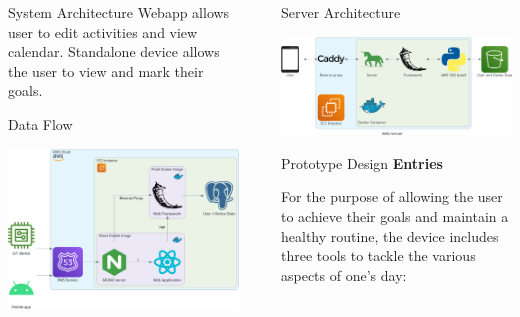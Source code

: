 \documentclass[final]{beamer}
\newlength{\sepwidth}
\newlength{\colwidth}
\newcommand{\separatorcolumn}{\begin{column}{\sepwidth}\end{column}}
\begin{document}
\begin{frame}[t]
\begin{columns}[t]
\begin{column}{\colwidth}
\begin{block}{System Architecture}
    Webapp allows user to edit activities and view calendar. Standalone device allows the user to view and mark their goals.

  \end{block}

  \begin{block}{Data Flow}
    \vskip 0.5cm
    \begin{center}
      \includegraphics[width = 0.8 \linewidth]{data_flow.png}
    \end{center}
  \end{block}
\end{column}

\separatorcolumn

\begin{column}{\colwidth}
  \begin{block}{Server Architecture}
    \vskip 0.5cm
    \begin{center}
      \includegraphics[width = 0.8 \linewidth]{web_server.png}
    \end{center}
  \end{block}

    \begin{block}{Prototype Design}
    \textbf{Entries}

    For the purpose of allowing the user to achieve their goals and maintain a healthy routine, the device includes three tools to tackle the various aspects of one's day:


\end{block}
\end{column}
\end{columns}
\end{frame}
\end{document}

